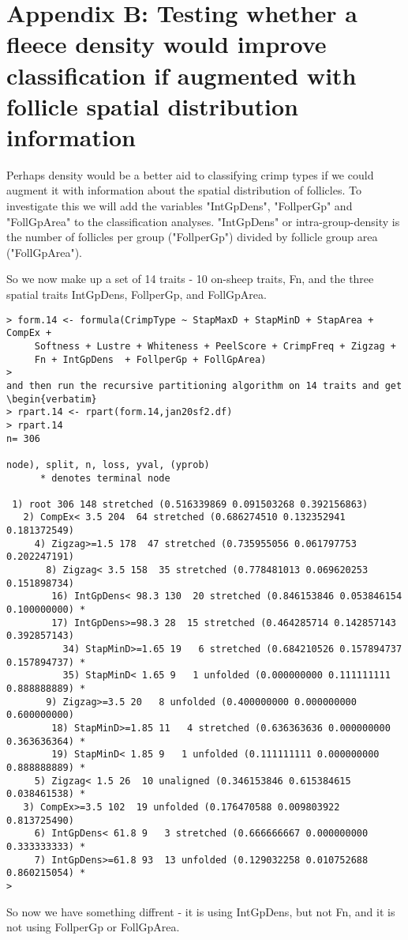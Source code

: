 \documentclass[titlepage]{article}  %
\begin{document}
 
\appendix
\section{Appendix B: Testing whether a fleece density  would improve classification if augmented with follicle spatial distribution information}
 
Perhaps density would be a better aid to classifying crimp types if we could augment it with information about the spatial distribution of follicles. To investigate this we will add the variables "IntGpDens",  "FollperGp" and "FollGpArea" to the classification analyses.  "IntGpDens" or intra-group-density is the number of follicles per group ("FollperGp") divided by follicle group area ("FollGpArea").

So we now make up a set of 14 traits - 10 on-sheep traits, Fn, and the three spatial traits IntGpDens, FollperGp, and FollGpArea.
\begin{verbatim}
> form.14 <- formula(CrimpType ~ StapMaxD + StapMinD + StapArea + CompEx +
     Softness + Lustre + Whiteness + PeelScore + CrimpFreq + Zigzag +
     Fn + IntGpDens  + FollperGp + FollGpArea)
> 
and then run the recursive partitioning algorithm on 14 traits and get
\begin{verbatim}
> rpart.14 <- rpart(form.14,jan20sf2.df)
> rpart.14
n= 306 

node), split, n, loss, yval, (yprob)
      * denotes terminal node

 1) root 306 148 stretched (0.516339869 0.091503268 0.392156863)  
   2) CompEx< 3.5 204  64 stretched (0.686274510 0.132352941 0.181372549)  
     4) Zigzag>=1.5 178  47 stretched (0.735955056 0.061797753 0.202247191)  
       8) Zigzag< 3.5 158  35 stretched (0.778481013 0.069620253 0.151898734)  
        16) IntGpDens< 98.3 130  20 stretched (0.846153846 0.053846154 0.100000000) *
        17) IntGpDens>=98.3 28  15 stretched (0.464285714 0.142857143 0.392857143)  
          34) StapMinD>=1.65 19   6 stretched (0.684210526 0.157894737 0.157894737) *
          35) StapMinD< 1.65 9   1 unfolded (0.000000000 0.111111111 0.888888889) *
       9) Zigzag>=3.5 20   8 unfolded (0.400000000 0.000000000 0.600000000)  
        18) StapMinD>=1.85 11   4 stretched (0.636363636 0.000000000 0.363636364) *
        19) StapMinD< 1.85 9   1 unfolded (0.111111111 0.000000000 0.888888889) *
     5) Zigzag< 1.5 26  10 unaligned (0.346153846 0.615384615 0.038461538) *
   3) CompEx>=3.5 102  19 unfolded (0.176470588 0.009803922 0.813725490)  
     6) IntGpDens< 61.8 9   3 stretched (0.666666667 0.000000000 0.333333333) *
     7) IntGpDens>=61.8 93  13 unfolded (0.129032258 0.010752688 0.860215054) *
> 
\end{verbatim}
 So now we have something diffrent - it is using IntGpDens, but not Fn, and it is not using FollperGp or FollGpArea.
\end{document}
